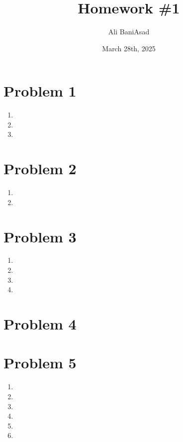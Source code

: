 \documentclass[12]{fphw}
\title{Homework \#1} %
\author{Ali BaniAsad} %
\date{March 28th, 2025} %
\institute{Sharif University of Technology \\ Institute of Aerospace} %
\begin{document}
\maketitle %
\section*{Problem 1}
\begin{enumerate}[label=(\alph*)]
	\item 
	
	\newpage
	\item 
	
	\newpage
	\item 
	
\end{enumerate}
\newpage
\section*{Problem 2}

\begin{enumerate}[label=(\alph*)]
	\item 
	
	\item 
	
\end{enumerate}


\newpage
\section*{Problem 3}

\begin{enumerate}[label=(\alph*)]
	\item 
	
	\item 
	
	\item 
	
	\item 
	
\end{enumerate}
\section*{Problem 4}

\section*{Problem 5}
\begin{enumerate}[label=(\alph*)]
	\item 
	
	\item
		
	\item 
	
	\item 
	
	\item 
	
	\item 
	
\end{enumerate}
\end{document}
